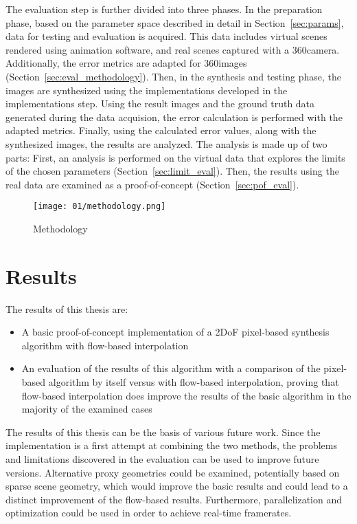 The evaluation step is further divided into three phases. In the preparation phase, based on the parameter space described in detail in Section~\ref{sec:params}, data for testing and evaluation is acquired. This data includes virtual scenes rendered using animation software, and real scenes captured with a 360\degree camera. Additionally, the error metrics are adapted for 360\degree images (Section~\ref{sec:eval_methodology}).
Then, in the synthesis and testing phase, the images are synthesized using the implementations developed in the implementations step. Using the result images and the ground truth data generated during the data acquision, the error calculation is performed with the adapted metrics.
Finally, using the calculated error values, along with the synthesized images, the results are analyzed. The analysis is made up of two parts: First, an analysis is performed on the virtual data that explores the limits of the chosen parameters (Section~\ref{sec:limit_eval}). Then, the results using the real data are examined as a proof-of-concept (Section~\ref{sec:pof_eval}).

\begin{figure}
		\centering
		\texttt{[image: 01/methodology.png]}
		\caption{Methodology}
		\label{fig:methodology}
\end{figure}

\section*{Results}
The results of this thesis are:
\begin{itemize}
  \item A basic proof-of-concept implementation of a 2DoF pixel-based synthesis algorithm with flow-based interpolation
  \item An evaluation of the results of this algorithm with a comparison of the pixel-based algorithm by itself versus with flow-based interpolation, proving that flow-based interpolation does improve the results of the basic algorithm in the majority of the examined cases
\end{itemize}

The results of this thesis can be the basis of various future work. Since the implementation is a first attempt at combining the two methods, the problems and limitations discovered in the evaluation can be used to improve future versions. Alternative proxy geometries could be examined, potentially based on sparse scene geometry, which would improve the basic results and could lead to a distinct improvement of the flow-based results. Furthermore, parallelization and optimization could be used in order to achieve real-time framerates. 

